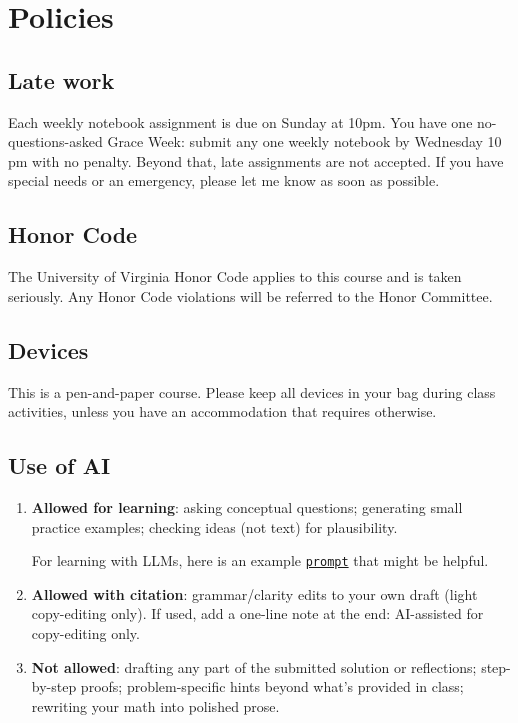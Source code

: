 \documentclass[oneside,11pt]{amsart}
\begin{document}
\section{Policies}

\subsection{Late work}

Each weekly notebook assignment is due on Sunday at 10pm.
You have one no-questions-asked Grace Week: submit any one weekly notebook by Wednesday 10 pm with no penalty. Beyond that,
late assignments are not accepted. 
If you have special needs or an emergency, please let me know as soon as possible.

\subsection{Honor Code}
The University of Virginia Honor Code applies to this course and is taken seriously. Any Honor Code violations will be referred to the Honor Committee. 

\subsection{Devices}

This is a pen-and-paper course. Please keep all devices in your bag during class activities, unless you have an accommodation that requires otherwise.

\subsection{Use of AI}

\begin{enumerate}[$\bullet$]
  \item \textbf{Allowed for learning}: asking conceptual questions; generating small practice examples; checking ideas (not text) for plausibility.

\noindent
For learning with LLMs, here is an example \href{https://gist.githubusercontent.com/lenis2000/cb5ea004f8aa6461be71398e19ae488e/raw/a0103eab0b865a1cedf2f3bf3c00d217bd294005/AI_hint_prompt.txt}{\texttt{prompt}} that might be helpful.
  \item \textbf{Allowed with citation}: grammar/clarity edits to your own draft (light copy-editing only). If used, add a one-line note at the end: AI-assisted for copy-editing only.

  \item \textbf{Not allowed}: drafting any part of the submitted solution or reflections; step-by-step proofs; problem-specific hints beyond what's provided in class; rewriting your math into polished prose.
\end{enumerate}
\end{document}

